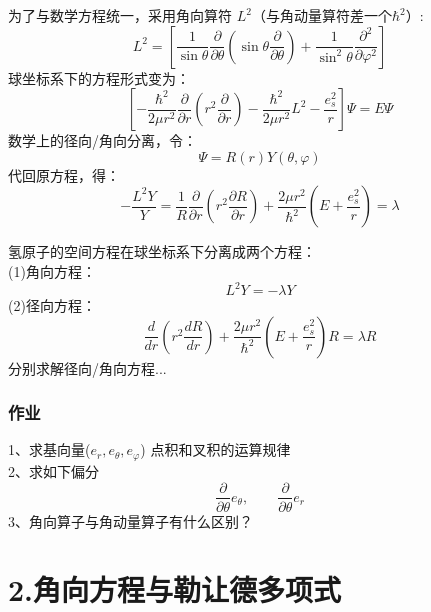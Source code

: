 \begin{frame}
	为了与数学方程统一，采用角向算符 $L^2$（与角动量算符差一个$\hbar ^2$）:
	\begin{equation*}
		L^2 =  \left[ \frac{1}{ \sin \theta  } \frac{\partial }{\partial \theta } (\sin \theta \frac{\partial }{\partial \theta } )
		+\frac{1}{ \sin^2 \theta  } \frac{\partial^2}{\partial\varphi ^2} \right]
	\end{equation*}	
	球坐标系下的方程形式变为：
	\begin{equation*}
		\left[-\frac{\hbar^2}{2 \mu r^2}  \frac{\partial }{\partial r} (r^2\frac{\partial }{\partial r} ) -  \frac{\hbar ^2 }{2 \mu r^2} L^2  -\frac{e_s ^2}{r} \right] \Psi
		=E\Psi
	\end{equation*}	
	数学上的径向/角向分离，令： 
	\begin{equation*}
		\Psi=R (r) Y(\theta,\varphi)
	\end{equation*}	
	代回原方程，得：
	\begin{equation*}
		-\frac{ L^2 Y}{Y}= \frac{1}{R}   \frac{\partial }{\partial r} (r^2\frac{\partial R }{\partial r} ) + \frac{2 \mu r^2} {\hbar^2}(E+ \frac{e_s ^2}{r} )=\lambda
	\end{equation*}	
\end{frame}		

\begin{frame}
	氢原子的空间方程在球坐标系下分离成两个方程：	\\
	(1)角向方程：
	\begin{equation*}
		L^2 Y=-\lambda Y 
	\end{equation*}	
	(2)径向方程：
	\begin{equation*}
		\frac{d}{d r} (r^2\frac{d R }{d r} ) + \frac{2 \mu r^2} {\hbar^2}(E+ \frac{e_s ^2}{r} ) R =\lambda R
	\end{equation*}	
	分别求解径向/角向方程...
\end{frame}	

\begin{frame}
	\frametitle{ 作业 }
	1、求基向量($e_r, e_\theta, e_\varphi$) 点积和叉积的运算规律\\
	2、求如下偏分
	\begin{equation*}
	\frac{\partial }{\partial \theta}  e_\theta, \qquad \frac{\partial }{\partial \theta}  e_r 
	\end{equation*}	
    3、角向算子与角动量算子有什么区别？
\end{frame}	

\section{2.角向方程与勒让德多项式}

